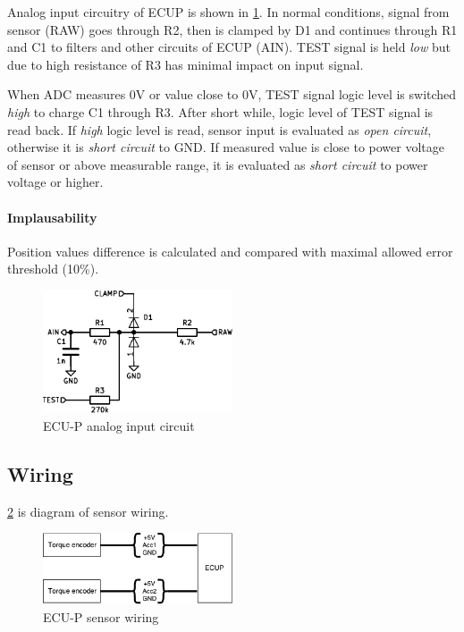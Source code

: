 Analog input circuitry of ECUP is shown in \ref{fig:ecup_analog_input}. In normal conditions, signal from sensor (RAW) goes through R2, then is clamped by D1 and continues through R1 and C1 to filters and other circuits of ECUP (AIN). TEST signal is held \textit{low} but due to high resistance of R3 has minimal impact on input signal.

When ADC measures 0V or value close to 0V, TEST signal logic level is switched \textit{high} to charge C1 through R3. After short while, logic level of TEST signal is read back. If \textit{high} logic level is read, sensor input is evaluated as \textit{open circuit}, otherwise it is \textit{short circuit} to GND. If measured value is close to power voltage of sensor or above measurable range, it is evaluated as \textit{short circuit} to power voltage or higher.

\paragraph{Implausability}
Position values difference is calculated and compared with maximal allowed error threshold (10\%).

\begin{figure}[H]
\begin{center}
	\includegraphics[width=0.5\textwidth]{./img/ECUP_AIN.pdf}
	\caption{ECU-P analog input circuit}
	\label{fig:ecup_analog_input}
\end{center}
\end{figure}



\subsection{Wiring}
\ref{fig:ecup_wiring} is diagram of sensor wiring.

\begin{figure}[H]
\begin{center}
	\includegraphics[width=0.5\textwidth]{./img/ECUP_wiring.pdf}
	\caption{ECU-P sensor wiring}
	\label{fig:ecup_wiring}
\end{center}
\end{figure}

